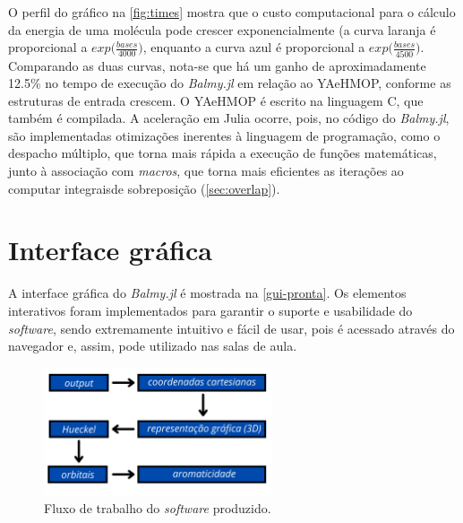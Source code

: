 O perfil do gráfico na \autoref{fig:times} mostra que o custo computacional para o cálculo da energia de uma molécula pode crescer exponencialmente (a curva laranja é proporcional a $\textit{exp}\bigg({\displaystyle \frac{bases}{4000}}\bigg)$, enquanto a curva azul é proporcional a $\textit{exp}\bigg({\displaystyle \frac{bases}{4500}} \bigg)$. Comparando as duas curvas, nota-se que há um ganho de aproximadamente 12.5\% no tempo de execução do \textit{Balmy.jl} em relação ao \gls{YAeHMOP}, conforme as estruturas de entrada crescem. O \gls{YAeHMOP} é escrito na linguagem C, que também é compilada. A aceleração em Julia ocorre, pois, no código do \textit{Balmy.jl}, são implementadas otimizações inerentes à linguagem de programação, como o despacho múltiplo, que torna mais rápida a execução de funções matemáticas, junto à associação com \textit{macros}, que torna mais eficientes as iterações ao computar integraisde sobreposição (\autoref{sec:overlap}).

\section{Interface gráfica}\label{design}

A interface gráfica do \textit{Balmy.jl} é mostrada na \autoref{gui-pronta}. Os elementos interativos foram implementados para garantir o suporte e usabilidade do \textit{software}, sendo extremamente intuitivo e fácil de usar, pois é acessado através do navegador e, assim, pode utilizado nas salas de aula.

\begin{figure}[htb]
	\caption{\label{workflow} Fluxo de trabalho do \textit{software} produzido.}
	\begin{center}
		\includegraphics[width=0.6\textwidth]{images/workflow.png}
	\end{center}
\end{figure}

